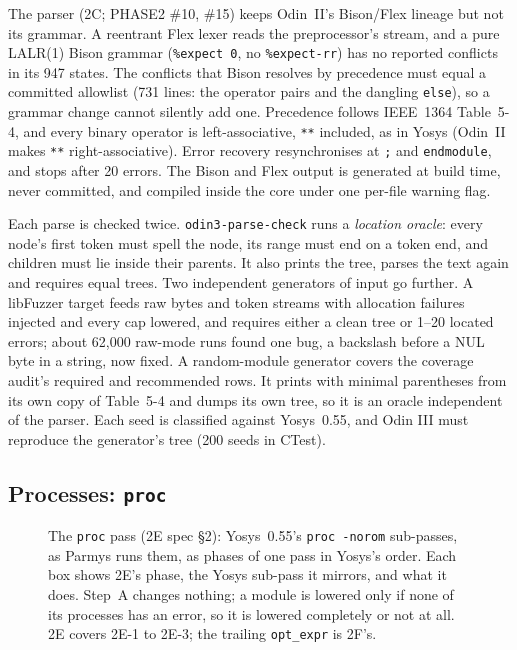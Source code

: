 \documentclass[conference]{IEEEtran}
\newcommand{\code}[1]{\texttt{#1}}
\begin{document}
The parser (2C; PHASE2 \#10, \#15) keeps Odin~II's Bison/Flex lineage but not its grammar. A
reentrant Flex lexer reads the preprocessor's stream, and a pure LALR(1) Bison grammar
(\code{\%expect 0}, no \code{\%expect-rr}) has no reported conflicts in its 947 states. The
conflicts that Bison resolves by precedence must equal a committed allowlist (731 lines: the
operator pairs and the dangling \code{else}), so a grammar change cannot silently add one.
Precedence follows IEEE~1364 Table~5-4, and every binary operator is left-associative,
\code{**} included, as in Yosys (Odin~II makes \code{**} right-associative). Error recovery
resynchronises at \code{;} and \code{endmodule}, and stops after 20 errors. The Bison and Flex
output is generated at build time, never committed, and compiled inside the core under one
per-file warning flag.

Each parse is checked twice. \code{odin3-parse-check} runs a \emph{location oracle}: every
node's first token must spell the node, its range must end on a token end, and children must
lie inside their parents. It also prints the tree, parses the text again and requires equal
trees. Two independent generators of input go further. A libFuzzer target feeds raw bytes and
token streams with allocation failures injected and every cap lowered, and requires either a
clean tree or 1--20 located errors; about 62,000 raw-mode runs found one bug, a backslash before
a NUL byte in a string, now fixed. A random-module generator covers the coverage audit's
required and recommended rows. It prints with minimal parentheses from its own copy of
Table~5-4 and dumps its own tree, so it is an oracle independent of the parser. Each seed is
classified against Yosys~0.55, and Odin III must reproduce the generator's tree (200 seeds in
CTest).

\subsection{Processes: \code{proc}}

\begin{figure}[t]
\centering
\odinfit{\columnwidth}{}
\caption{The \code{proc} pass (2E spec \S2): Yosys~0.55's \code{proc -norom} sub-passes, as
Parmys runs them, as phases of one pass in Yosys's order. Each box shows 2E's phase, the
Yosys sub-pass it mirrors, and what it does. Step~A changes nothing; a module is lowered only if
none of its processes has an error, so it is lowered completely or not at all. 2E covers
2E-1 to 2E-3; the trailing \code{opt\_expr} is 2F's.}
\label{fig:proc}
\end{figure}
\end{document}

